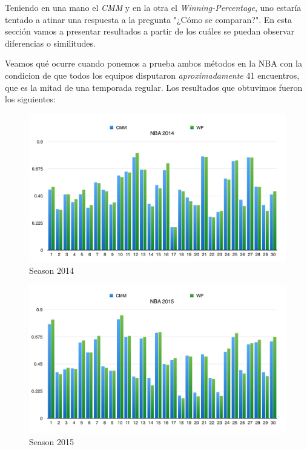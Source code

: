Teniendo en una mano el \textit{CMM} y en la otra el \textit{Winning-Percentage}, uno estar\'ia tentado a atinar una respuesta a la pregunta "¿C\'omo se comparan?". En esta secci\'on vamos a presentar resultados a partir de los cu\'ales se puedan observar diferencias o similitudes.

Veamos qu\'e ocurre cuando ponemos a prueba ambos m\'etodos en la NBA con la condicion de que todos los equipos disputaron \textit{aproximadamente} 41 encuentros, que es la mitad de una temporada regular. Los resultados que obtuvimos fueron los siguientes: \\

\begin{figure}[h!]
  \begin{center}
	\includegraphics[scale=0.50]{imagenes/cualitative/comparative/nba2014.png}
	\caption{Season 2014}
  \end{center}
\end{figure}

\begin{figure}[h!]
  \begin{center}
	\includegraphics[scale=0.50]{imagenes/cualitative/comparative/nba2015.png}
	\caption{Season 2015}
  \end{center}
\end{figure}

